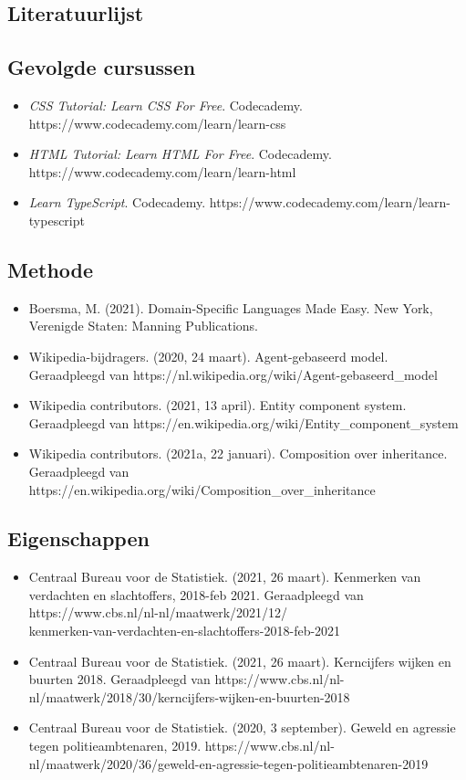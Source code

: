 \documentclass[12pt, letterpaper]{article}
\begin{document}
\newpage
\begin{appendices}
\section{Literatuurlijst}
\subsection{Gevolgde cursussen}
\begin{itemize}
    \item \emph{CSS Tutorial: Learn CSS For Free}. Codecademy. https://www.codecademy.com/learn/learn-css
    \item \emph{HTML Tutorial: Learn HTML For Free}. Codecademy. https://www.codecademy.com/learn/learn-html
    \item \emph{Learn TypeScript}. Codecademy. https://www.codecademy.com/learn/learn-typescript
\end{itemize}
\subsection{Methode}
\begin{itemize}
    \item Boersma, M. (2021). Domain-Specific Languages Made Easy. New York, Verenigde Staten: Manning Publications.
    \item Wikipedia-bijdragers. (2020, 24 maart). Agent-gebaseerd model. Geraadpleegd van https://nl.wikipedia.org/wiki/Agent-gebaseerd\_model
    \item Wikipedia contributors. (2021, 13 april). Entity component system. Geraadpleegd van https://en.wikipedia.org/wiki/Entity\_component\_system
    \item Wikipedia contributors. (2021a, 22 januari). Composition over inheritance. Geraadpleegd van https://en.wikipedia.org/wiki/Composition\_over\_inheritance
\end{itemize}
\subsection{Eigenschappen} \label{bronnencbs}
\begin{itemize}
    \item Centraal Bureau voor de Statistiek. (2021, 26 maart). Kenmerken van verdachten en slachtoffers, 2018-feb 2021. Geraadpleegd van https://www.cbs.nl/nl-nl/maatwerk/2021/12/ \\kenmerken-van-verdachten-en-slachtoffers-2018-feb-2021
    \item Centraal Bureau voor de Statistiek. (2021, 26 maart). Kerncijfers wijken en buurten 2018. Geraadpleegd van https://www.cbs.nl/nl-nl/maatwerk/2018/30/kerncijfers-wijken-en-buurten-2018
    \item Centraal Bureau voor de Statistiek. (2020, 3 september). Geweld en agressie tegen politieambtenaren, 2019. https://www.cbs.nl/nl-nl/maatwerk/2020/36/geweld-en-agressie-tegen-politieambtenaren-2019
\end{itemize}

\end{appendices}
\end{document}
